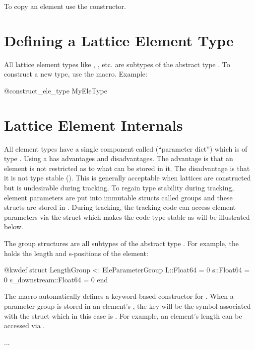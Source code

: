 To copy an element use the  constructor.

\section{Defining a Lattice Element Type}
\label{s:ele.type}

All lattice element types like , , etc. are subtypes of the abstract type
. To construct a new type, use the  macro. Example:
\begin{example}
  @construct_ele_type MyEleType
\end{example}

\section{Lattice Element Internals}
\label{s:ele.inside}

All element types have a single component called  (``parameter dict'') which is of
type . Using a  has advantages and disadvantages. The advantage is
that an element is not restricted as to what can be stored in it. The disadvantage is that it is not
type stable (). This is generally acceptable when lattices are constructed but
is undesirable during tracking. To regain type stability during tracking, element parameters are
put into immutable structs called  groups 
and these structs are stored in . During tracking, the tracking
code can access element parameters via the struct which makes the code type stable as will be illustrated below.

The  group structures are all subtypes of the abstract type .
For example, the  holds the length and s-positions of the element:
\begin{example}
  @kwdef struct LengthGroup <: EleParameterGroup
    L::Float64 = 0
    s::Float64 = 0
    s_downstream::Float64 = 0
  end
\end{example}
The \vn{\@kwdef} macro automatically defines a keyword-based constructor for . 
When a parameter group is stored in an element's , the key will be the symbol associated
with the struct which in this case is . For example, an element's length can be
accessed via . 


\etcetc...



